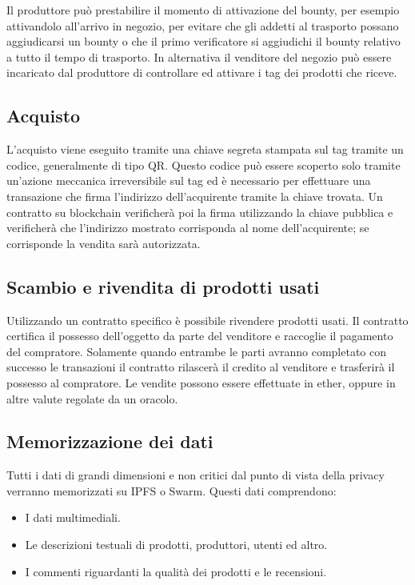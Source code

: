 Il produttore può prestabilire il momento di attivazione del bounty, per esempio attivandolo all'arrivo in negozio, per evitare che gli addetti al trasporto possano aggiudicarsi un bounty o che il primo verificatore si aggiudichi il bounty relativo a tutto il tempo di trasporto. In alternativa il venditore del negozio può essere incaricato dal produttore di controllare ed attivare i tag dei prodotti che riceve.

\subsection{Acquisto}
\label{acquisto}
L'acquisto viene eseguito tramite una chiave segreta stampata sul tag tramite un codice, generalmente di tipo QR. Questo codice può essere scoperto solo tramite un'azione meccanica irreversibile sul tag ed è necessario per effettuare una transazione che firma l'indirizzo dell'acquirente tramite la chiave trovata. Un contratto su blockchain verificherà poi la firma utilizzando la chiave pubblica e verificherà che l'indirizzo mostrato corrisponda al nome dell'acquirente; se corrisponde la vendita sarà autorizzata.

\subsection{Scambio e rivendita di prodotti usati}
Utilizzando un contratto specifico è possibile rivendere prodotti usati. Il contratto certifica il possesso dell'oggetto da parte del venditore e raccoglie il pagamento del compratore. Solamente quando entrambe le parti avranno completato con successo le transazioni il contratto rilascerà il credito al venditore e trasferirà il possesso al compratore. Le vendite possono essere effettuate in ether, oppure in altre valute regolate da un oracolo. 

\subsection{Memorizzazione dei dati}
Tutti i dati di grandi dimensioni e non critici dal punto di vista della privacy verranno memorizzati su IPFS o Swarm. Questi dati comprendono:
\begin{itemize}
    \item I dati multimediali.
    \item Le descrizioni testuali di prodotti, produttori, utenti ed altro.
    \item I commenti riguardanti la qualità dei prodotti e le recensioni.
\end{itemize}

